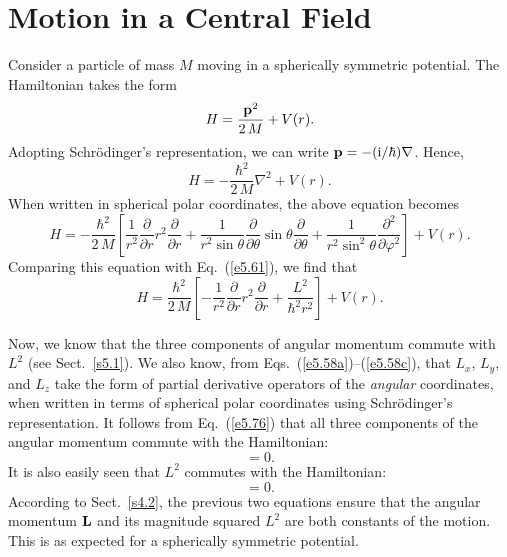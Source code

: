 \section{Motion in a Central Field}\label{s5.5}
Consider a particle of mass $M$ moving in a spherically symmetric potential.
The Hamiltonian takes the form
\begin{equation}
H = \frac{{\bf p}^2}{2\,M} + V(r).
\end{equation}
Adopting Schr\"{o}dinger's representation, we can write ${\bf p} = -({\rm i}/\hbar)
\nabla$. Hence,
\begin{equation}
H = -\frac{\hbar^2}{2\,M} \nabla^2 + V(r).
\end{equation}
When written in spherical polar coordinates, the above equation becomes
\begin{equation}
H= -\frac{\hbar^2}{2\,M}\left[ \frac{1}{r^2}\frac{\partial}{\partial r}
r^2\frac{\partial}{\partial r}  + \frac{1}{r^2\sin\theta}
\frac{\partial}{\partial \theta} 
\sin\theta \frac{\partial}{\partial\theta} 
+ \frac{1}{r^2\sin^2\theta} \frac{\partial^2}{\partial\varphi^2}\right]
+ V(r).
\end{equation}
Comparing this equation with Eq.~(\ref{e5.61}), we find that
\begin{equation}\label{e5.76}
H= \frac{\hbar^2}{2\,M}\left[- \frac{1}{r^2}\frac{\partial}{\partial r}
r^2\frac{\partial}{\partial r} + \frac{L^2}{\hbar^2 r^2}\right] +
V(r).
\end{equation}

Now, we know that the three components of angular momentum commute with $L^2$ (see Sect.~\ref{s5.1}). We also know, from Eqs.~(\ref{e5.58a})--(\ref{e5.58c}), that $L_x$, $L_y$, and $L_z$ take the
form of partial derivative operators of the {\em angular} coordinates,
when written in terms of spherical polar coordinates using  Schr\"{o}dinger's representation. It follows from Eq.~(\ref{e5.76}) that all three components of the angular
momentum commute with the Hamiltonian:
\begin{equation}
[{\bf L}, H] = 0.
\end{equation}
It is also easily seen that $L^2$ commutes with the Hamiltonian:
\begin{equation}
[L^2, H] = 0.
\end{equation}
According to Sect.~\ref{s4.2},  the previous two equations
ensure that the angular momentum ${\bf L}$ and its magnitude squared $L^2$
are both constants of the motion. This is as expected for a spherically
symmetric potential. 

